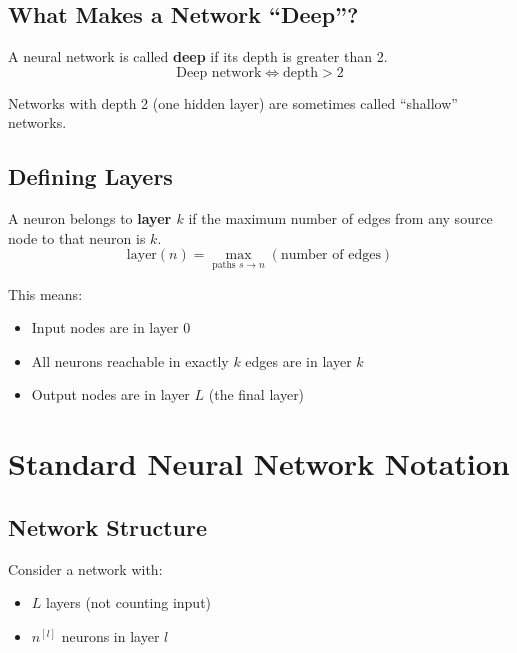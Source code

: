 \subsection{What Makes a Network ``Deep''?}

\begin{definitionbox}
A neural network is called \textbf{deep} if its depth is greater than 2.
\[
\text{Deep network} \Leftrightarrow \text{depth} > 2
\]
\end{definitionbox}

Networks with depth 2 (one hidden layer) are sometimes called ``shallow'' networks.

\subsection{Defining Layers}

\begin{definitionbox}
A neuron belongs to \textbf{layer $k$} if the maximum number of edges from any source node to that neuron is $k$.
\[
\text{layer}(n) = \max_{\text{paths } s \to n} (\text{number of edges})
\]
\end{definitionbox}

This means:
\begin{itemize}
    \item Input nodes are in layer 0
    \item All neurons reachable in exactly $k$ edges are in layer $k$
    \item Output nodes are in layer $L$ (the final layer)
\end{itemize}


\section{Standard Neural Network Notation}

\subsection{Network Structure}

Consider a network with:
\begin{itemize}
    \item $L$ layers (not counting input)
    \item $n^{[l]}$ neurons in layer $l$
\end{itemize}

